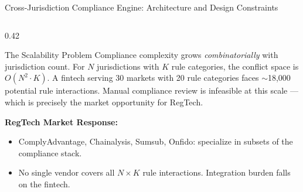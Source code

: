 \begin{frame}{Cross-Jurisdiction Compliance Engine: Architecture and Design Constraints}
\begin{columns}[T]
\begin{column}{0.42\textwidth}
\begin{alertblock}{The Scalability Problem}
        Compliance complexity grows \emph{combinatorially} with jurisdiction count. For $N$ jurisdictions with $K$ rule categories, the conflict space is $O(N^2 \cdot K)$. A fintech serving 30 markets with 20 rule categories faces $\sim$18,000 potential rule interactions. Manual compliance review is infeasible at this scale --- which is precisely the market opportunity for RegTech.
      \end{alertblock}
      \vspace{0.2em}
      \textbf{RegTech Market Response:}
      \begin{itemize}\small
        \item ComplyAdvantage, Chainalysis, Sumsub, Onfido: specialize in subsets of the compliance stack.
        \item No single vendor covers all $N \times K$ rule interactions. Integration burden falls on the fintech.
      \end{itemize}
    \end{column}
  \end{columns}
\end{frame}


